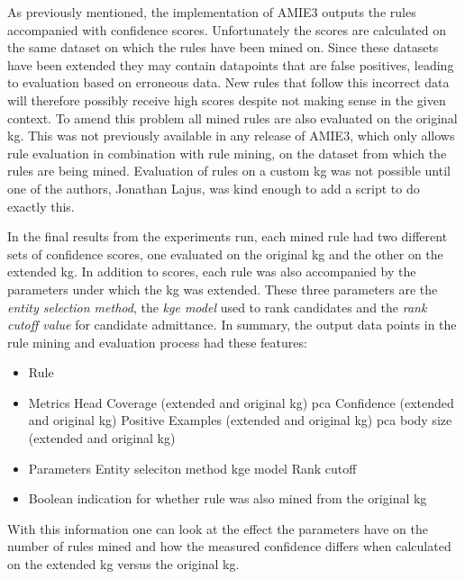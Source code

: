 As previously mentioned, the implementation of AMIE3 outputs the rules accompanied with confidence scores. Unfortunately the scores are calculated on the same dataset on which the rules have been mined on. Since these datasets have been extended they may contain datapoints that are false positives, leading to evaluation based on erroneous data. New rules that follow this incorrect data will therefore possibly receive high scores despite not making sense in the given context. To amend this problem all mined rules are also evaluated on the original \gls{kg}.
This was not previously available in any release of AMIE3, which only allows rule evaluation in combination with rule mining, on the dataset from which the rules are being mined. Evaluation of rules on a custom \gls{kg} was not possible until one of the authors, Jonathan Lajus, was kind enough to add a script to do exactly this.

In the final results from the experiments run, each mined rule had two different sets of confidence scores, one evaluated on the original \gls{kg} and the other on the extended \gls{kg}. In addition to scores, each rule was also accompanied by the parameters under which the \gls{kg} was extended. These three parameters are the \textit{entity selection method}, the \textit{\gls{kge} model} used to rank candidates and the \textit{rank cutoff value} for candidate admittance. In summary, the output data points in the rule mining and evaluation process had these features:
\begin{itemize}
    \item Rule
    \item Metrics
        \subitem Head Coverage (extended and original \gls{kg})
        \subitem \gls{pca} Confidence (extended and original \gls{kg})
        \subitem Positive Examples (extended and original \gls{kg})
        \subitem \gls{pca} body size (extended and original \gls{kg})
    \item Parameters
        \subitem Entity seleciton method
        \subitem \gls{kge} model
        \subitem Rank cutoff
    \item Boolean indication for whether rule was also mined from the original \gls{kg}
\end{itemize}

With this information one can look at the effect the parameters have on the number of rules mined and how the measured confidence differs when calculated on the extended \gls{kg} versus the original \gls{kg}.


